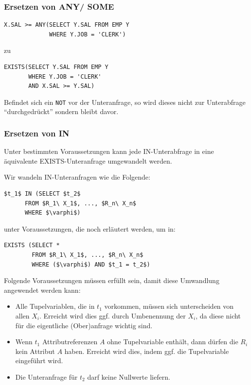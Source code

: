 \subsubsection*{Ersetzen von ANY/ SOME}

\begin{verbatim}
X.SAL >= ANY(SELECT Y.SAL FROM EMP Y 
             WHERE Y.JOB = 'CLERK')
\end{verbatim} zu
\begin{verbatim}
EXISTS(SELECT Y.SAL FROM EMP Y 
       WHERE Y.JOB = 'CLERK' 
       AND X.SAL >= Y.SAL)
\end{verbatim}

Befindet sich ein \verb|NOT| vor der Unteranfrage, so wird dieses nicht zur Unterabfrage ``durchgedrückt'' sondern bleibt davor.

\subsubsection{Ersetzen von IN}

Unter bestimmten Voraussetzungen kann jede IN-Unterabfrage in eine äquivalente EXISTS-Unteranfrage umgewandelt werden.

Wir wandeln IN-Unteranfragen wie die Folgende:

\begin{lstlisting}[mathescape]
$t_1$ IN (SELECT $t_2$
      FROM $R_1\ X_1$, ..., $R_n\ X_n$
      WHERE $\varphi$)
\end{lstlisting}

unter Voraussetzungen, die noch erläutert werden, um in:

\begin{lstlisting}[mathescape]
EXISTS (SELECT *
        FROM $R_1\ X_1$, ..., $R_n\ X_n$
        WHERE ($\varphi$) AND $t_1 = t_2$)
\end{lstlisting}

Folgende Voraussetzungen müssen erfüllt sein, damit diese Umwandlung angewendet werden kann:

\begin{itemize}
\item Alle Tupelvariablen, die in $t_1$ vorkommen, müssen sich unterscheiden von allen $X_i$. Erreicht wird dies ggf. durch Umbenennung der $X_i$, da diese nicht für die eigentliche (Ober)anfrage wichtig sind.
\item Wenn $t_1$ Attributreferenzen $A$ ohne Tupelvariable enthält, dann dürfen die $R_i$ kein Attribut $A$ haben. Erreicht wird dies, indem ggf. die Tupelvariable eingeführt wird.
\item Die Unteranfrage für $t_2$ darf keine Nullwerte liefern.
\end{itemize}

